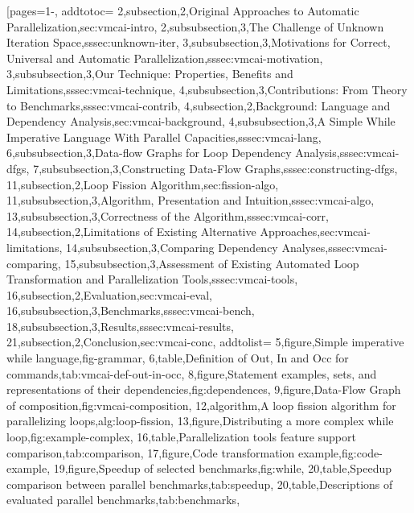 [pages={1-},
    addtotoc={
        2,subsection,2,{Original Approaches to Automatic Parallelization},sec:vmcai-intro,
        2,subsubsection,3,{The Challenge of Unknown Iteration Space},sssec:unknown-iter,
        3,subsubsection,3,{Motivations for Correct, Universal and Automatic Parallelization},sssec:vmcai-motivation,
        3,subsubsection,3,{Our Technique: Properties, Benefits and Limitations},sssec:vmcai-technique,
        4,subsubsection,3,{Contributions: From Theory to Benchmarks},sssec:vmcai-contrib,
        4,subsection,2,{Background: Language and Dependency Analysis},sec:vmcai-background,
        4,subsubsection,3,{A Simple While Imperative Language With Parallel Capacities},sssec:vmcai-lang,
        6,subsubsection,3,{Data-flow Graphs for Loop Dependency Analysis},sssec:vmcai-dfgs,
        7,subsubsection,3,{Constructing Data-Flow Graphs},sssec:constructing-dfgs,
        11,subsection,2,{Loop Fission Algorithm},sec:fission-algo,
        11,subsubsection,3,{Algorithm, Presentation and Intuition},sssec:vmcai-algo,
        13,subsubsection,3,{Correctness of the Algorithm},sssec:vmcai-corr,
        14,subsection,2,{Limitations of Existing Alternative Approaches},sec:vmcai-limitations,
        14,subsubsection,3,{Comparing Dependency Analyses},sssec:vmcai-comparing,
        15,subsubsection,3,{Assessment of Existing Automated Loop Transformation and Parallelization Tools},sssec:vmcai-tools,
        16,subsection,2,{Evaluation},sec:vmcai-eval,
        16,subsubsection,3,{Benchmarks},sssec:vmcai-bench,
        18,subsubsection,3,{Results},sssec:vmcai-results,
        21,subsection,2,{Conclusion},sec:vmcai-conc},
    addtolist={
        5,figure,{Simple imperative while language},fig-grammar,
        6,table,{Definition of Out, In and Occ for commands},tab:vmcai-def-out-in-occ,
        8,figure,{Statement examples, sets, and representations of their dependencies},fig:dependences,
        9,figure,{Data-Flow Graph of composition},fig:vmcai-composition,
        12,algorithm,{A loop fission algorithm for parallelizing loops},alg:loop-fission,
        13,figure,{Distributing a more complex while loop},fig:example-complex,
        16,table,{Parallelization tools feature support comparison},tab:comparison,
        17,figure,{Code transformation example},fig:code-example,
        19,figure,{Speedup of selected benchmarks},fig:while,
        20,table,{Speedup comparison between parallel benchmarks},tab:speedup,
        20,table,{Descriptions of evaluated parallel benchmarks},tab:benchmarks},
